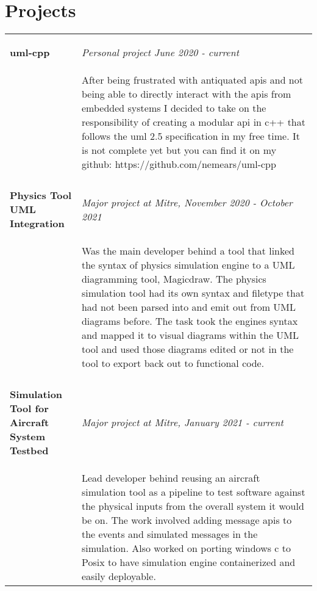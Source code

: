 \documentclass[10pt]{article}
\begin{document}
\section*{Projects}
\begin{tabular}{l | p{13cm}}
  \begin{minipage}[t]{4cm}
    \begin{flushleft}
      \large \textbf{uml-cpp}
    \end{flushleft}
  \end{minipage} &
  \textit{Personal project June 2020 - current} \\
  & After being frustrated with antiquated apis and not being able to directly interact with the apis from embedded systems I decided to take on the responsibility of creating a modular api in c++ that follows the uml 2.5 specification in my free time. It is not complete yet but you can find it on my github: https://github.com/nemears/uml-cpp \\
  \multicolumn{2}{c}{} \\
  \begin{minipage}[t]{4cm}
    \begin{flushleft}
      \large \textbf{Physics Tool UML Integration}
    \end{flushleft}
  \end{minipage} &
  \textit{Major project at Mitre, November 2020 - October 2021} \\
  & Was the main developer behind a tool that linked the syntax of physics simulation engine to a UML diagramming tool, Magicdraw. The physics simulation tool had its own syntax and filetype that had not been parsed into and emit out from UML diagrams before. The task took the engines syntax and mapped it to visual diagrams within the UML tool and used those diagrams edited or not in the tool to export back out to functional code. \\
  \multicolumn{2}{c}{} \\
  \begin{minipage}[t]{4cm}
    \begin{flushleft}
      \large \textbf{Simulation Tool for Aircraft System Testbed}
    \end{flushleft}
  \end{minipage} &
  \textit{Major project at Mitre, January 2021 - current} \\
  & Lead developer behind reusing an aircraft simulation tool as a pipeline to test software against the physical inputs from the overall system it would be on. The work involved adding message apis to the events and simulated messages in the simulation. Also worked on porting windows c to Posix to have simulation engine containerized and easily deployable.
\end{tabular}
\end{document}

